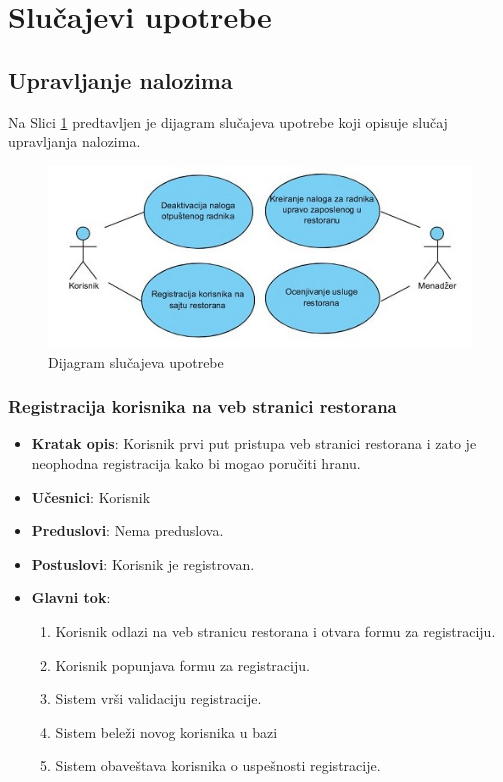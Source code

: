 \newpage
\section{Slu\v cajevi upotrebe}
\subsection{Upravljanje nalozima}

Na Slici \ref{fig:slika9} predtavljen je dijagram slučajeva upotrebe koji opisuje slučaj upravljanja nalozima.

\newpage

\begin{figure}[ht]
    \leavevmode
    \begin{center}
    \includegraphics[width=1\textwidth]{slike/Upravljanje_nalozima.JPG}
    \end{center}
    \caption{Dijagram slučajeva upotrebe}
    \label{fig:slika9}
\end{figure}


\subsubsection{Registracija korisnika na veb stranici restorana}
\begin{itemize}
    \item \textbf{Kratak opis}:
    Korisnik prvi put pristupa veb stranici restorana i zato je neophodna registracija kako bi mogao poručiti hranu.
    \item \textbf{Učesnici}:
    Korisnik
    \item \textbf{Preduslovi}:
    Nema preduslova. 
    \item \textbf{Postuslovi}:
    Korisnik je registrovan. 
    \item \textbf{Glavni tok}:
    \begin{enumerate}
        \item Korisnik odlazi na veb stranicu restorana i otvara formu za registraciju.
        \item Korisnik popunjava formu za registraciju.
        \item Sistem vrši validaciju registracije.
        \item Sistem beleži novog korisnika u bazi
        \item Sistem obaveštava korisnika o uspešnosti registracije.
    \end{enumerate}
\end{itemize}

